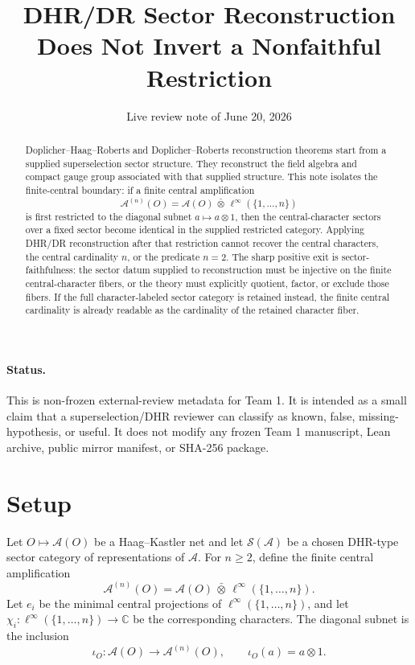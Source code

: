 \documentclass[12pt]{article}
\title{DHR/DR Sector Reconstruction\\
Does Not Invert a Nonfaithful Restriction}
\author{}
\date{Live review note of June 20, 2026}
\theoremstyle{remark}
\newcommand{\A}{\mathcal A}
\newcommand{\C}{\mathbb C}
\newcommand{\Sectors}{\mathcal S}
\begin{document}
\maketitle

\begin{abstract}
Doplicher--Haag--Roberts and Doplicher--Roberts reconstruction theorems start
from a supplied superselection sector structure.  They reconstruct the field
algebra and compact gauge group associated with that supplied structure.  This
note isolates the finite-central boundary: if a finite central amplification
\[
  \A^{(n)}(O)=\A(O)\,\bar\otimes\,\ell^\infty(\{1,\ldots,n\})
\]
is first restricted to the diagonal subnet \(a\mapsto a\otimes1\), then the
central-character sectors over a fixed sector become identical in the supplied
restricted category.  Applying DHR/DR reconstruction after that restriction
cannot recover the central characters, the central cardinality \(n\), or the
predicate \(n=2\).  The sharp positive exit is sector-faithfulness: the sector
datum supplied to reconstruction must be injective on the finite
central-character fibers, or the theory must explicitly quotient, factor, or
exclude those fibers.  If the full character-labeled sector category is
retained instead, the finite central cardinality is already readable as the
cardinality of the retained character fiber.
\end{abstract}

\paragraph{Status.}
This is non-frozen external-review metadata for Team 1.  It is intended as a
small claim that a superselection/DHR reviewer can classify as known, false,
missing-hypothesis, or useful.  It does not modify any frozen Team 1
manuscript, Lean archive, public mirror manifest, or SHA-256 package.

\section{Setup}

Let \(O\mapsto\A(O)\) be a Haag--Kastler net and let
\(\Sectors(\A)\) be a chosen DHR-type sector category of representations of
\(\A\).  For \(n\ge2\), define the finite central amplification
\[
  \A^{(n)}(O)=\A(O)\,\bar\otimes\,\ell^\infty(\{1,\ldots,n\}).
\]
Let \(e_i\) be the minimal central projections of
\(\ell^\infty(\{1,\ldots,n\})\), and let
\(\chi_i:\ell^\infty(\{1,\ldots,n\})\to\C\) be the corresponding characters.
The diagonal subnet is the inclusion
\[
  \iota_O:\A(O)\to\A^{(n)}(O),\qquad \iota_O(a)=a\otimes1.
\]
\end{document}
